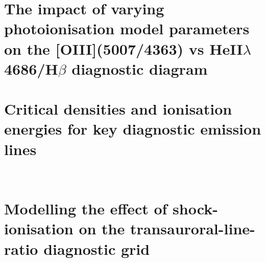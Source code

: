 \documentclass[12pt, twoside, openright]{report}
\begin{document}
\appendix

\normalsize

\chapter[Photoionisation modelling of the {[}OIII{]}(5007/4363) vs HeII$\lambda$4686/H$\beta$ diagnostic diagram]{The impact of varying photoionisation model parameters on the {[}OIII{]}(5007/4363) vs HeII$\lambda$4686/H$\beta$ diagnostic diagram}
\label{appendix: heii_hb_oiii_photoionisation_modelling}


\chapter{Critical densities and ionisation energies for key diagnostic emission lines}
\label{appendix: properties_of_warm_ionised_diagnostic_lines}


\newpage
\thispagestyle{plain}
~\newpage
\thispagestyle{plain}
~\newpage

\chapter{Modelling the effect of shock-ionisation on the transauroral-line-ratio diagnostic grid}
\label{appendix: tr_grid_shock_modelling}

\end{document}
